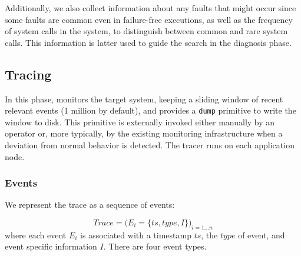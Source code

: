 Additionally, we also collect information about any faults that might occur since some faults are common even in failure-free executions, as well as the frequency of system calls in the system, to distinguish between common and rare system calls.
This information is latter used to guide the search in the diagnosis phase.

\subsection{Tracing}
\label{sec:tracing}

In this phase, \sys monitors the target system, keeping a sliding window of recent relevant events (1 million by default), and provides a \texttt{dump} primitive to write the window to disk.
This primitive is externally invoked either manually by an operator or, more typically, by the existing monitoring infrastructure when a deviation from normal behavior is detected.
The tracer runs on each application node.

\subsubsection{Events} We represent the trace as a sequence of events:

\[Trace = \Big( E_i = \{ts,type,I\} \Big)_{i=1...n} \]
where each event $E_i$ is associated with a timestamp $ts$, the $type$ of event, and event specific information $I$.
There are four event types.

